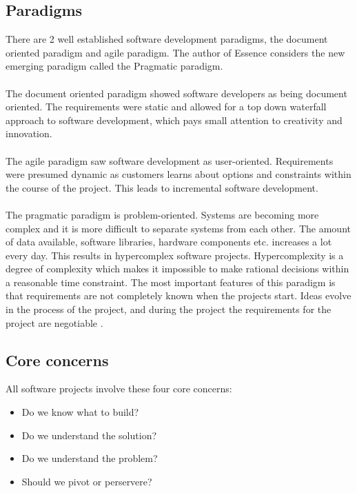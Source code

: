 \subsection{Paradigms}
There are 2 well established software development paradigms, the document oriented paradigm and agile paradigm.
The author of Essence considers the new emerging paradigm called the Pragmatic paradigm.
\\\\
The document oriented paradigm showed software developers as being document oriented. 
The requirements were static and allowed for a top down waterfall approach to software development, which pays small attention to creativity and innovation.
\\\\
The agile paradigm saw software development as user-oriented.
Requirements were presumed dynamic as customers learns about options and constraints within the course of the project.
This leads to incremental software development.
\\\\
The pragmatic paradigm is problem-oriented. 
Systems are becoming more complex and it is more difficult to separate systems from each other. 
The amount of data available, software libraries, hardware components etc. increases a lot every day.
This results in hypercomplex software projects.
Hypercomplexity is a degree of complexity which makes it impossible to make rational decisions within a reasonable time constraint.
The most important features of this paradigm is that requirements are not completely known when the projects start.
Ideas evolve in the process of the project, and during the project the requirements for the project are negotiable \autocite{Essence}. 


\subsection{Core concerns}
All software projects involve these four core concerns:

\begin{itemize}
    \item Do we know what to build?
    \item Do we understand the solution?
    \item Do we understand the problem?
    \item Should we pivot or perservere?
\end{itemize}


